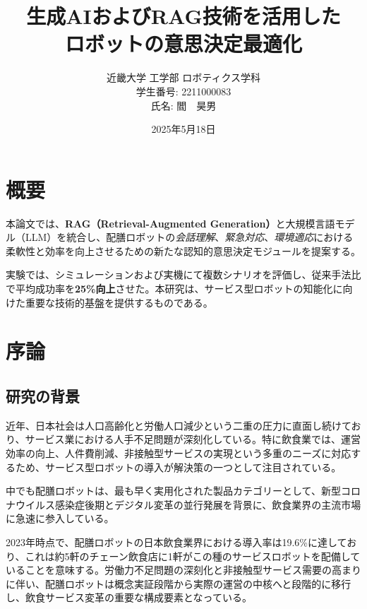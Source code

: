 \documentclass[12pt]{report}
\title{\LARGE 生成AIおよびRAG技術を活用した\\ロボットの意思決定最適化}
\author{近畿大学 工学部 ロボティクス学科\\[10pt]
学生番号: 2211000083\\[5pt]
氏名: 閻　昊男}
\date{2025年5月18日}
\begin{document}
\maketitle
\thispagestyle{empty}
\newpage

\setcounter{page}{1}

\chapter*{概要}

本論文では、\textbf{RAG（Retrieval-Augmented Generation）}と大規模言語モデル（LLM）を統合し、配膳ロボットの\textit{会話理解}、\textit{緊急対応}、\textit{環境適応}における柔軟性と効率を向上させるための新たな認知的意思決定モジュールを提案する。

実験では、シミュレーションおよび実機にて複数シナリオを評価し、従来手法比で平均成功率を\textbf{25\%向上}させた。本研究は、サービス型ロボットの知能化に向けた重要な技術的基盤を提供するものである。

\newpage

\tableofcontents
\newpage

\setcounter{page}{1}

\chapter{序論}
\label{chap:intro}

\section{研究の背景}
\label{sec:background}

近年、日本社会は人口高齢化と労働人口減少という二重の圧力に直面し続けており、サービス業における人手不足問題が深刻化している。特に飲食業では、運営効率の向上、人件費削減、非接触型サービスの実現という多重のニーズに対応するため、サービス型ロボットの導入が解決策の一つとして注目されている。

中でも配膳ロボットは、最も早く実用化された製品カテゴリーとして、新型コロナウイルス感染症後期とデジタル変革の並行発展を背景に、飲食業界の主流市場に急速に参入している。

2023年時点で、配膳ロボットの日本飲食業界における導入率は19.6\%に達しており、これは約5軒のチェーン飲食店に1軒がこの種のサービスロボットを配備していることを意味する。労働力不足問題の深刻化と非接触型サービス需要の高まりに伴い、配膳ロボットは概念実証段階から実際の運営の中核へと段階的に移行し、飲食サービス変革の重要な構成要素となっている。
\end{document}
